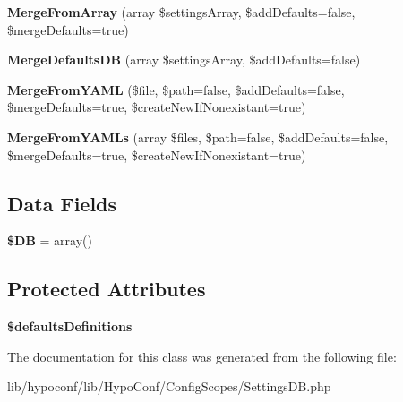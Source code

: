 \begin{DoxyCompactItemize}
\item 
\hypertarget{class_hypo_conf_1_1_config_scopes_1_1_settings_d_b_aadd7a6734f6e922c77bff24a68557b15}{
{\bfseries \-Merge\-From\-Array} (array \$settings\-Array, \$add\-Defaults=false, \$merge\-Defaults=true)}
\label{class_hypo_conf_1_1_config_scopes_1_1_settings_d_b_aadd7a6734f6e922c77bff24a68557b15}

\item 
\hypertarget{class_hypo_conf_1_1_config_scopes_1_1_settings_d_b_a3e18d107f21e522d4580ec5078484a44}{
{\bfseries \-Merge\-Defaults\-D\-B} (array \$settings\-Array, \$add\-Defaults=false)}
\label{class_hypo_conf_1_1_config_scopes_1_1_settings_d_b_a3e18d107f21e522d4580ec5078484a44}

\item 
\hypertarget{class_hypo_conf_1_1_config_scopes_1_1_settings_d_b_a9f7664ff1779f6ab4d5c206e338cae16}{
{\bfseries \-Merge\-From\-Y\-A\-M\-L} (\$file, \$path=false, \$add\-Defaults=false, \$merge\-Defaults=true, \$create\-New\-If\-Nonexistant=true)}
\label{class_hypo_conf_1_1_config_scopes_1_1_settings_d_b_a9f7664ff1779f6ab4d5c206e338cae16}

\item 
\hypertarget{class_hypo_conf_1_1_config_scopes_1_1_settings_d_b_a895473e0bb0f4f3c5bb10ec24284b454}{
{\bfseries \-Merge\-From\-Y\-A\-M\-Ls} (array \$files, \$path=false, \$add\-Defaults=false, \$merge\-Defaults=true, \$create\-New\-If\-Nonexistant=true)}
\label{class_hypo_conf_1_1_config_scopes_1_1_settings_d_b_a895473e0bb0f4f3c5bb10ec24284b454}

\end{DoxyCompactItemize}
\subsection*{\-Data \-Fields}
\begin{DoxyCompactItemize}
\item 
\hypertarget{class_hypo_conf_1_1_config_scopes_1_1_settings_d_b_a7dc56dc8b18ad37272b56fa7395bedef}{
{\bfseries \$\-D\-B} = array()}
\label{class_hypo_conf_1_1_config_scopes_1_1_settings_d_b_a7dc56dc8b18ad37272b56fa7395bedef}

\end{DoxyCompactItemize}
\subsection*{\-Protected \-Attributes}
\begin{DoxyCompactItemize}
\item 
\hypertarget{class_hypo_conf_1_1_config_scopes_1_1_settings_d_b_a3c9d04cb9158cd619830f457e2627deb}{
{\bfseries \$defaults\-Definitions}}
\label{class_hypo_conf_1_1_config_scopes_1_1_settings_d_b_a3c9d04cb9158cd619830f457e2627deb}

\end{DoxyCompactItemize}


\-The documentation for this class was generated from the following file\-:\begin{DoxyCompactItemize}
\item 
lib/hypoconf/lib/\-Hypo\-Conf/\-Config\-Scopes/\-Settings\-D\-B.\-php\end{DoxyCompactItemize}
